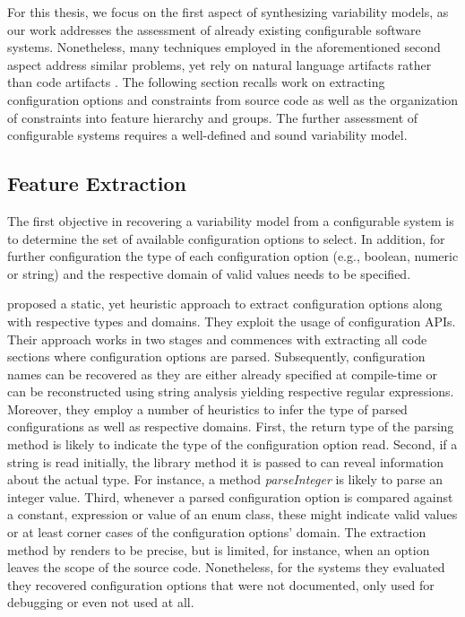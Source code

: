 For this thesis, we focus on the first aspect of synthesizing variability
models, as our work addresses the assessment of already existing configurable
software systems. Nonetheless, many techniques employed in the aforementioned
second aspect address similar problems, yet rely on natural language artifacts
rather than code artifacts \citep{alves_exploratory_2008,bakar_feature_2015}.
The following section recalls work on extracting configuration options and
constraints from source code as well as the organization of constraints into
feature hierarchy and groups. The further assessment of configurable systems
requires a well-defined and sound variability model.

\subsection{Feature Extraction} 
The first objective in recovering a variability model from a configurable
system is to determine the set of available configuration options to select. In
addition, for further configuration the type of each configuration option
(e.g., boolean, numeric or string) and the respective domain of valid values
needs to be specified.

\cite{rabkin_static_2011} proposed a static, yet heuristic approach to extract
configuration options along with respective types and domains. They exploit the
usage of configuration APIs. Their approach works
in two stages and commences with extracting all code sections where
configuration options are parsed. Subsequently, configuration names can be
recovered as they are either already specified at compile-time or can be
reconstructed using string analysis yielding respective regular expressions.
Moreover, they employ a number of heuristics to infer the type of parsed
configurations as well as respective domains. First, the return type of the
parsing method is likely to indicate the type of the configuration option read.
Second, if a string is read initially, the library method it is passed to can
reveal information about the actual type. For instance, a method
\emph{parseInteger} is likely to parse an integer value. Third, whenever a
parsed configuration option is compared against a constant, expression or value of an enum class,
these might indicate valid values or at least corner cases of the configuration
options' domain. The extraction method by \cite{rabkin_static_2011} renders to be precise, but is
limited, for instance, when an option leaves the scope of the source code.
Nonetheless, for the systems they evaluated they recovered configuration
options that were not documented, only used for debugging or even not used at
all.

